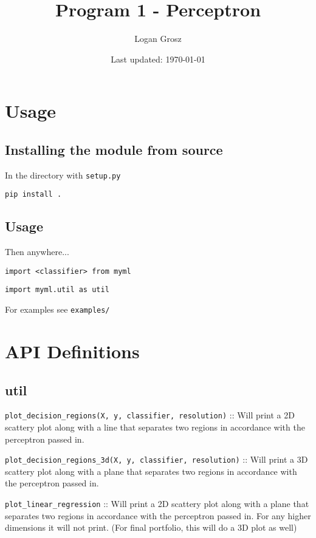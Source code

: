 \documentclass{article}
\title{Program 1 - Perceptron} \author{Logan Grosz} \date{Last updated: \today}
\begin{document}
\maketitle

\tableofcontents

\newpage

\section{Usage}

\subsection{Installing the module from source}

In the directory with \texttt{setup.py}

\texttt{pip install .}

\subsection{Usage}

Then anywhere...

\texttt{import <classifier> from myml}

\texttt{import myml.util as util}

For examples see \texttt{examples/}

\section{API Definitions}

\subsection{util}

\texttt{plot\_decision\_regions(X, y, classifier, resolution)} :: Will print a
2D scattery plot along with a line that separates two regions in accordance with
the perceptron passed in.

\texttt{plot\_decision\_regions\_3d(X, y, classifier, resolution)} :: Will print
a 3D scattery plot along with a plane that separates two regions in accordance
with the perceptron passed in.

\texttt{plot\_linear\_regression} :: Will print a 2D scattery plot along with a
plane that separates two regions in accordance with the perceptron passed in.
For any higher dimensions it will not print. (For final portfolio, this will do
a 3D plot as well)
\end{document}
